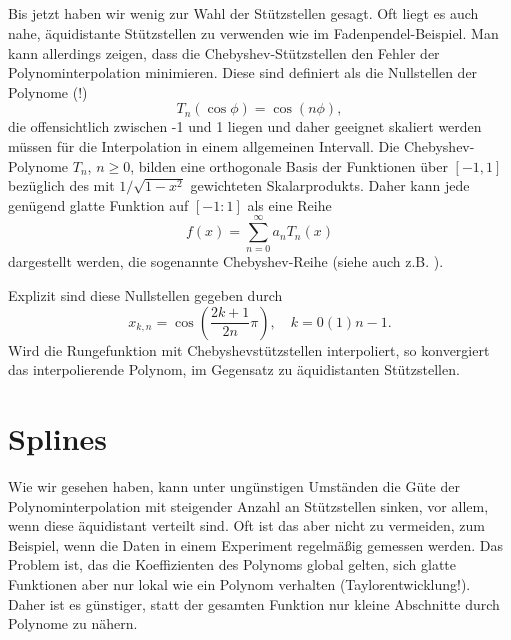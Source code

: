 \subsection{}

Bis jetzt haben wir wenig zur Wahl der Stützstellen gesagt. Oft liegt
es auch nahe, äquidistante Stützstellen zu verwenden wie im
Fadenpendel-Beispiel. Man kann allerdings zeigen, dass die
Chebyshev-Stützstellen den Fehler der Polynominterpolation minimieren.
Diese sind definiert als die Nullstellen der Polynome (!)
\begin{equation}
  \label{eq:chebyshev}
  T_n(\cos\phi) = \cos(n\phi),
\end{equation}
die offensichtlich zwischen -1 und 1 liegen und daher geeignet
skaliert werden müssen für die Interpolation in einem allgemeinen
Intervall. Die Chebyshev-Polynome $T_n$, $n\ge 0$, bilden eine
orthogonale Basis der Funktionen über $[-1,1]$ bezüglich des mit
$1/\sqrt{1-x^2}$ gewichteten Skalarprodukts. Daher kann jede genügend
glatte Funktion auf $[-1:1]$ als eine Reihe
\begin{equation}
  f(x) = \sum_{n=0}^\infty a_n T_n(x)
\end{equation}
dargestellt werden, die sogenannte Chebyshev-Reihe (siehe auch z.B.
\textcite{abramowitz70a}).

 Explizit sind diese Nullstellen gegeben durch
\begin{equation}
  x_{k,n} = \cos\left(\frac{2k+1}{2n}\pi\right),\quad k=0(1)n-1.
\end{equation}
Wird die Rungefunktion mit Chebyshevstützstellen interpoliert, so
konvergiert das interpolierende Polynom, im Gegensatz zu äquidistanten
Stützstellen.

\section{Splines}

Wie wir gesehen haben, kann unter ungünstigen Umständen die Güte der
Polynominterpolation mit steigender Anzahl an Stützstellen sinken, vor
allem, wenn diese äquidistant verteilt sind. Oft ist das aber nicht zu
vermeiden, zum Beispiel, wenn die Daten in einem Experiment regelmäßig
gemessen werden. Das Problem ist, das die Koeffizienten des Polynoms
global gelten, sich glatte Funktionen aber nur lokal wie ein Polynom
verhalten (Taylorentwicklung!). Daher ist es günstiger, statt der
gesamten Funktion nur kleine Abschnitte durch Polynome zu nähern.

